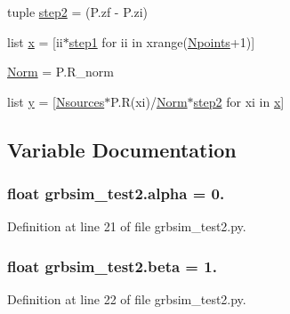 \begin{DoxyCompactItemize}
\item 
tuple \hyperlink{namespacegrbsim__test2_af770ca6f904dd3c99f4f3ff311baef96}{step2} = (P.\-zf -\/ P.\-zi)
\item 
list \hyperlink{namespacegrbsim__test2_af3ce9539dbd66711a210223e0c4fe6ba}{x} = \mbox{[}ii$\ast$\hyperlink{namespacegrbsim__test2_ace66778df3269bdd4347faf034639aaf}{step1} for ii in xrange(\hyperlink{namespacegrbsim__test2_a189373bc9fb066e8b9cb32bde08b6303}{Npoints}+1)\mbox{]}
\item 
\hyperlink{namespacegrbsim__test2_a1ed80b3823c02db556f19f345e0a323d}{Norm} = P.\-R\-\_\-norm
\item 
list \hyperlink{namespacegrbsim__test2_aa5930b6868e7cac458e6d1289e0dc7af}{y} = \mbox{[}\hyperlink{namespacegrbsim__test2_a54ecb545b55707213e4268f70d92c8dc}{Nsources}$\ast$P.\-R(xi)/\hyperlink{namespacegrbsim__test2_a1ed80b3823c02db556f19f345e0a323d}{Norm}$\ast$\hyperlink{namespacegrbsim__test2_af770ca6f904dd3c99f4f3ff311baef96}{step2} for xi in \hyperlink{namespacegrbsim__test2_af3ce9539dbd66711a210223e0c4fe6ba}{x}\mbox{]}
\end{DoxyCompactItemize}


\subsection{Variable Documentation}
\hypertarget{namespacegrbsim__test2_afae8b761442f0621df6e5d2dc0952c2b}{
\subsubsection[{alpha}]{\setlength{\rightskip}{0pt plus 5cm}float grbsim\-\_\-test2.\-alpha = 0.}}\label{namespacegrbsim__test2_afae8b761442f0621df6e5d2dc0952c2b}


Definition at line 21 of file grbsim\-\_\-test2.\-py.

\hypertarget{namespacegrbsim__test2_aab947809983f7713234bd51a3f89fa44}{
\subsubsection[{beta}]{\setlength{\rightskip}{0pt plus 5cm}float grbsim\-\_\-test2.\-beta = 1.}}\label{namespacegrbsim__test2_aab947809983f7713234bd51a3f89fa44}


Definition at line 22 of file grbsim\-\_\-test2.\-py.


